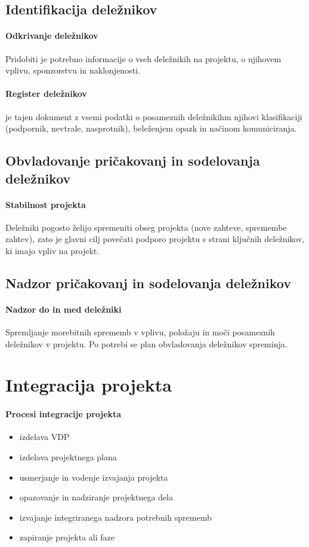 \documentclass[a4paper,12pt]{report}
\begin{document}
      \subsection{Identifikacija deležnikov}
         \paragraph{Odkrivanje deležnikov} Pridobiti je potrebno informacije o vseh deležnikih na projektu, o njihovem vplivu, sponzorstvu in naklonjenosti.
         \paragraph{Register deležnikov} je tajen dokument z vsemi podatki o posameznih deležnikihm njihovi klasifikaciji (podpornik, nevtrale, nasprotnik), beleženjem opazk in načinom komuniciranja.
      \subsection{Obvladovanje pričakovanj in sodelovanja deležnikov}
         \paragraph{Stabilnost projekta} Deležniki pogosto želijo spremeniti obseg projekta (nove zahteve, spremembe zahtev), zato je glavni cilj povečati podporo projektu s strani ključnih deležnikov, ki imajo vpliv na projekt.
      \subsection{Nadzor pričakovanj in sodelovanja deležnikov}
         \paragraph{Nadzor do in med deležniki} Spremljanje morebitnih sprememb v vplivu, položaju in moči posameznih deležnikov v projektu. Po potrebi se plan obvladovanja deležnikov spreminja.

   \section{Integracija projekta}
      \paragraph{Procesi integracije projekta}
         \begin{itemize}
            \item izdelava VDP
            \item izdelava projektnega plana
            \item usmerjanje in vodenje izvajanja projekta
            \item opazovanje in nadziranje projektnega dela
            \item izvajanje integriranega nadzora potrebnih sprememb
            \item zapiranje projekta ali faze
         \end{itemize}
\end{document}
